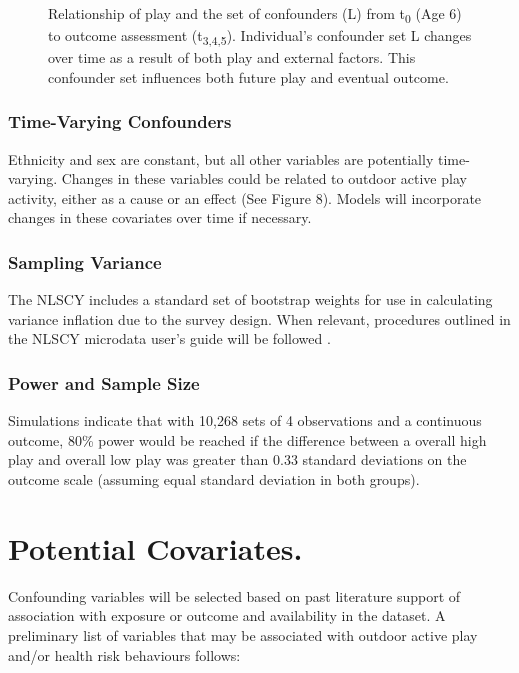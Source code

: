 \documentclass [11pt]{article}
\begin{document}
\begin{figure}
\caption{Relationship of play and the set of confounders (L) from t\textsubscript{0} (Age 6) to outcome assessment (t\textsubscript{3,4,5}). Individual's confounder set L changes over time as a result of both play and external factors. This confounder set influences both future play and eventual outcome.}
\label{timefig}
\end{figure}

\subsubsection{Time-Varying Confounders}

Ethnicity and sex are constant, but all other variables are potentially time-varying. Changes in these variables could be related to outdoor active play activity, either as a cause or an effect (See Figure 8). Models will incorporate changes in these covariates over time if necessary. 

\subsubsection{Sampling Variance}

The NLSCY includes a standard set of bootstrap weights for use in calculating variance inflation due to the survey design. When relevant, procedures outlined in the NLSCY microdata user's guide will be followed \cite{noauthor_undated-nd}. 

\subsubsection{Power and Sample Size}

Simulations indicate that with 10,268 sets of 4 observations and a continuous outcome, 80\% power would be reached if the difference between a overall high play and overall low play was greater than 0.33 standard deviations on the outcome scale (assuming equal standard deviation in both groups). 


\section{Potential Covariates.} Confounding variables will be selected based on past literature support of association with exposure or outcome and availability in the dataset. A preliminary list of variables that may be associated with outdoor active play and/or health risk behaviours follows:
\end{document}
